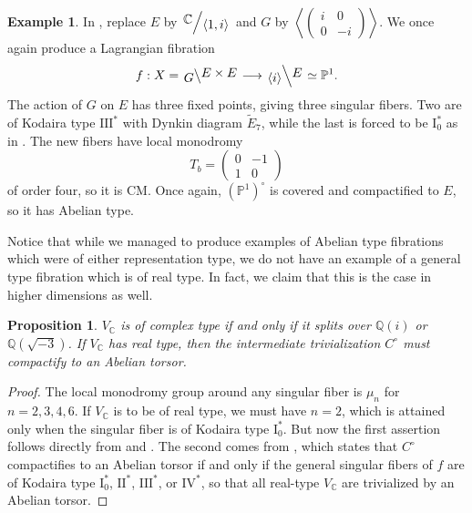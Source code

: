 \documentclass[12pt]{amsart}
\newcommand{\Q}{\mathbb{Q}}
\newcommand{\C}{\mathbb{C}}
\newcommand{\rightQ}[2]{\left.\raisebox{.2em}{$#1$}\middle/\raisebox{-.2em}{$#2$}\right.}
\newcommand{\leftQ}[2]{\left.\raisebox{-.2em}{$#2$}\middle\backslash\raisebox{.2em}{$#1$}\right.}
\newtheorem{proposition}[theorem]{Proposition}
\theoremstyle{definition}
\newtheorem{example}[theorem]{Example}
\theoremstyle{remark}
\numberwithin{equation}{section}
\begin{document}
\begin{example}
In , replace \(E\) by 
\(\rightQ{\C}{\left<1, i\right>}\) and \(G\) by
\(\left<\begin{pmatrix}
    i & 0 \\ 0 & -i
\end{pmatrix}\right>\).
We once again produce a Lagrangian fibration
\begin{equation}
    f: X = \leftQ{E \times E}{G} \longrightarrow 
    \leftQ{E}{\left<i\right>} \simeq \mathbb{P}^1.
\end{equation}
The action of \(G\) on \(E\) has three fixed points, giving three singular fibers.
Two are of Kodaira type \(\text{III}^*\) with Dynkin diagram \(\widetilde{E}_7\), 
while the last is forced to be \(\text{I}_0^*\) as in .
The new fibers have local monodromy
\begin{equation}
    T_b = \begin{pmatrix}
        0 & -1 \\ 1 & 0
    \end{pmatrix}
\end{equation}
of order four, so it is CM. Once again, \(\left(\mathbb{P}^1\right)^\circ\) is 
covered and compactified to \(E\), so it has Abelian type.
\end{example}

Notice that while we managed to produce examples of Abelian type fibrations which 
were of either representation type, we do not have an example of a general type 
fibration which is of real type. In fact, we claim that this is the case in higher 
dimensions as well.

\begin{proposition} \label{application-isotrivial-real}
    \(V_\C\) is of complex type if and only if it splits over \(\Q(i)\) or 
    \(\Q(\sqrt{-3})\). If \(V_\C\) has real type, then the intermediate
    trivialization \(C^\circ\) must compactify to an Abelian torsor.
\end{proposition}
\begin{proof}
    The local monodromy group around any singular fiber is 
    \(\mu_n\) for \(n=2,3,4,6\). If \(V_\C\) is to be of real type, we must have
    \(n=2\), which is attained only when the singular fiber is of Kodaira type 
    \(\text{I}_0^*\). But now the first assertion follows directly from 
     and . The second comes
    from \cite[Proposition 2.24]{kim-laza-martin23}, which states that \(C^\circ\)
    compactifies to an Abelian torsor if and only if the general singular fibers of
    \(f\) are of Kodaira type \(\text{I}_0^*\), \(\text{II}^*\), \(\text{III}^*\), or 
    \(\text{IV}^*\), so that all real-type \(V_\C\) are trivialized by an Abelian
    torsor.
\end{proof}






\end{document}
